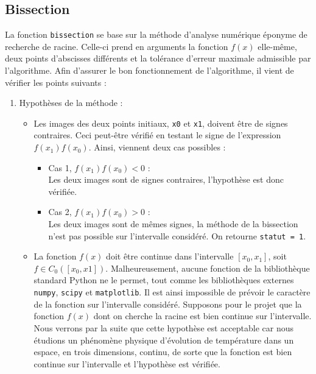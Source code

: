 \documentclass[12pt]{article}
\begin{document}
    \subsection{Bissection}
            La fonction \texttt{bissection} se base sur la méthode d'analyse numérique éponyme de recherche de racine. Celle-ci prend en arguments la fonction $f(x)$ elle-même, deux points d'abscisses différents et la tolérance d'erreur maximale admissible par l'algorithme. Afin d'assurer le bon fonctionnement de l'algorithme, il vient de vérifier les points suivants :
            \begin{enumerate}[label=\roman*.]
            \item Hypothèses de la méthode : 
                \begin{itemize}
                    \item 
                        Les images des deux points initiaux, \texttt{x0} et \texttt{x1}, doivent être de signes contraires. Ceci peut-être vérifié en testant le signe de l'expression $f(x_1)f(x_0)$. Ainsi, viennent deux cas possibles :
                        
                        \begin{itemize}
                            \item Cas 1, $f(x_1)f(x_0) < 0$ : \vspace{2mm} \\ 
                            Les deux images sont de signes contraires, l'hypothèse est donc vérifiée. \vspace{2mm} 
                            \item Cas 2, $f(x_1)f(x_0) > 0$ : \vspace{2mm} \\
                            Les deux images sont de mêmes signes, la méthode de la bissection n'est pas possible sur l'intervalle considéré. On retourne \texttt{statut = 1}.
                        \end{itemize}
                    \item
                        La fonction $f(x)$ doit être continue dans l'intervalle $[x_0 , x_1]$, soit $f \in C_0([x_0,x1])$. Malheureusement, aucune fonction de la bibliothèque standard Python ne le permet, tout comme les bibliothèques externes \texttt{numpy}, \texttt{scipy} et \texttt{matplotlib}. Il est ainsi impossible de prévoir le caractère de la fonction sur l'intervalle considéré. Supposons pour le projet que la fonction $f(x)$ dont on cherche la racine est bien continue sur l'intervalle. Nous verrons par la suite que cette hypothèse est acceptable car nous étudions un phénomène physique d'évolution de température dans un espace, en trois dimensions, continu, de sorte que la fonction est bien continue sur l'intervalle et l'hypothèse est vérifiée.
        

\end{itemize}
\end{enumerate}
\end{document}
